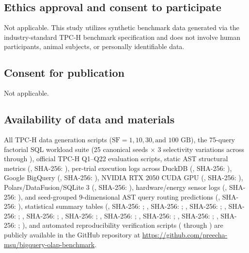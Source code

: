 \documentclass[10pt,a4paper]{article}
\begin{document}
\subsection*{Ethics approval and consent to participate}
Not applicable. This study utilizes synthetic benchmark data generated via the industry-standard TPC-H benchmark specification \cite{tpc2022tpch} and does not involve human participants, animal subjects, or personally identifiable data.

\subsection*{Consent for publication}
Not applicable.

\subsection*{Availability of data and materials}
All TPC-H data generation scripts ($\text{SF}=1, 10, 30, \text{and } 100\text{ GB}$), the 75-query factorial SQL workload suite (25 canonical seeds $\times$ 3 selectivity variations across  through ), official TPC-H Q1--Q22 evaluation scripts, static AST structural metrics (, SHA-256: ), per-trial execution logs across DuckDB (, SHA-256: ), Google BigQuery (, SHA-256: ), NVIDIA RTX 2050 CUDA GPU (, SHA-256: ), Polars/DataFusion/SQLite 3 (, SHA-256: ), hardware/energy sensor logs (, SHA-256: ), and seed-grouped 9-dimensional AST query routing predictions (, SHA-256: ), statistical summary tables (, SHA-256: ; , SHA-256: ; , SHA-256: ; , SHA-256: ; , SHA-256: ; , SHA-256: ; , SHA-256: ; , SHA-256: ; , SHA-256: ; , SHA-256: ; ), and automated reproducibility verification scripts ( through ) are publicly available in the GitHub repository at \url{https://github.com/preecha-msu/bigquery-olap-benchmark}.
\end{document}
